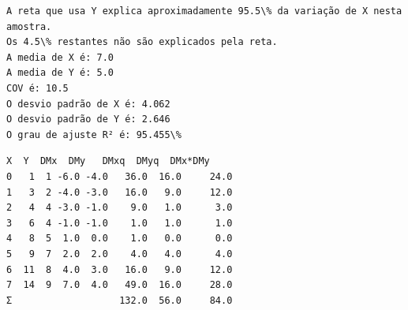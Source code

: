 \documentclass[11pt]{article}
\begin{document}
    \begin{Verbatim}[commandchars=\\\{\}]
A reta que usa Y explica aproximadamente 95.5\% da variação de X nesta amostra.
Os 4.5\% restantes não são explicados pela reta.
A media de X é: 7.0
A media de Y é: 5.0
COV é: 10.5
O desvio padrão de X é: 4.062
O desvio padrão de Y é: 2.646
O grau de ajuste R² é: 95.455\%
    \end{Verbatim}

    
    \begin{Verbatim}[commandchars=\\\{\}]
    X  Y  DMx  DMy   DMxq  DMyq  DMx*DMy
0   1  1 -6.0 -4.0   36.0  16.0     24.0
1   3  2 -4.0 -3.0   16.0   9.0     12.0
2   4  4 -3.0 -1.0    9.0   1.0      3.0
3   6  4 -1.0 -1.0    1.0   1.0      1.0
4   8  5  1.0  0.0    1.0   0.0      0.0
5   9  7  2.0  2.0    4.0   4.0      4.0
6  11  8  4.0  3.0   16.0   9.0     12.0
7  14  9  7.0  4.0   49.0  16.0     28.0
Σ                   132.0  56.0     84.0
    \end{Verbatim}
\end{document}
